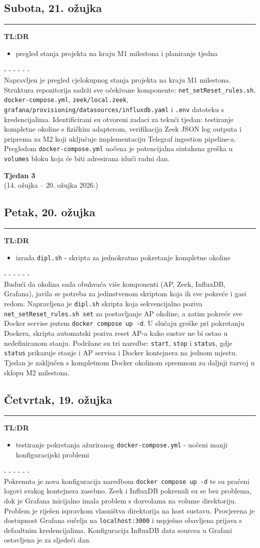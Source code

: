 \documentclass[12pt, a4paper]{article}
\newcommand{\tjedan}[2]{
    \newpage
    \vspace*{\fill}
    \begin{center}
        \addcontentsline{toc}{section}{Tjedan #1 (#2)}
        {\Huge \textbf{Tjedan #1}} \\[0.5em]
        {\Large (#2)}
    \end{center}
    \vspace*{\fill}
    \newpage
}
\newcommand{\dan}[1]{
    \subsection*{#1}
    \vspace{-0.5em} 
    \hrule \vspace{0.5em} 
}
\begin{document}
\dan{Subota, 21. ožujka}
\textbf{TL:DR}
\begin{itemize}
    \item pregled stanja projekta na kraju M1 milestona i planiranje tjedna
\end{itemize}
- - - - - - \\
Napravljen je pregled cjelokupnog stanja projekta na kraju M1 milestona.
Struktura repozitorija sadrži sve očekivane komponente: \lstinline|net_setReset_rules.sh|,
\lstinline|docker-compose.yml|, \lstinline|zeek/local.zeek|,
\lstinline|grafana/provisioning/datasources/influxdb.yaml| i \lstinline|.env| datoteku s
kredencijalima.
Identificirani su otvoreni zadaci za tekući tjedan: testiranje kompletne okoline s fizičkim
adapterom, verifikacija Zeek JSON log outputa i priprema za M2 koji uključuje implementaciju
Telegraf ingestion pipeline-a.
Pregledom \lstinline|docker-compose.yml| uočena je potencijalna sintaksna greška u
\lstinline|volumes| bloku koja će biti adresirana idući radni dan.

\tjedan{3}{14. ožujka -- 20. ožujka 2026.}

\dan{Petak, 20. ožujka}
\textbf{TL:DR}
\begin{itemize}
    \item izrada \lstinline|dipl.sh| - skripta za jednokratno pokretanje kompletne okoline
\end{itemize}
- - - - - - \\
Budući da okolina sada obuhvaća više komponenti (AP, Zeek, InfluxDB, Grafana), javila se potreba
za jedinstvenom skriptom koja ih sve pokreće i gasi redom.
Napravljena je \lstinline|dipl.sh| skripta koja sekvencijalno poziva \lstinline|net_setReset_rules.sh set|
za postavljanje AP okoline, a zatim pokreće sve Docker servise putem \lstinline|docker compose up -d|.
U slučaju greške pri pokretanju Dockera, skripta automatski poziva reset AP-a kako sustav ne bi
ostao u nedefiniranom stanju.
Podržane su tri naredbe: \lstinline|start|, \lstinline|stop| i \lstinline|status|, gdje
\lstinline|status| prikazuje stanje i AP servisa i Docker kontejnera na jednom mjestu.
Tjedan je zaključen s kompletnom Docker okolinom spremnom za daljnji razvoj u sklopu M2 milestona.

\dan{Četvrtak, 19. ožujka}
\textbf{TL:DR}
\begin{itemize}
    \item testiranje pokretanja ažuriranog \lstinline|docker-compose.yml| - uočeni manji konfiguracijski problemi
\end{itemize}
- - - - - - \\
Pokrenuta je nova konfiguracija naredbom \lstinline|docker compose up -d| te su praćeni logovi svakog kontejnera zasebno.
Zeek i InfluxDB pokrenuli su se bez problema, dok je Grafana inicijalno imala problem s dozvolama na volume direktoriju.
Problem je riješen ispravkom vlasništva direktorija na host sustavu.
Provjerena je dostupnost Grafana sučelja na \lstinline|localhost:3000| i uspješno obavljena prijava s defaultnim kredencijalima.
Konfiguracija InfluxDB data sourcea u Grafani ostavljena je za sljedeći dan.
 
\end{document}
